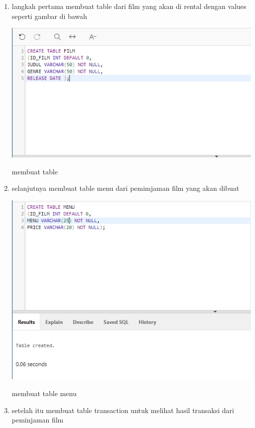 \documentclass{article}
\begin{document}
\begin{enumerate}
    \item langkah pertama membuat table dari film yang akan di rental dengan values seperti gambar di bawah
      
    \begin{center}
         \centering
            \includegraphics[scale=0.27]{figures/1.PNG}
        \caption{membuat table }
        \label{create}
    \end{center}
    
     \item selanjutnya membuat table menu dari pemimjaman film yang akan dibuat
      
    \begin{center}
         \centering
            \includegraphics[scale=0.27]{figures/2.PNG}
        \caption{membuat table menu }
        \label{create}
    \end{center}
    
     \item setelah itu membuat table transaction untuk melihat hasil transaksi dari peminjaman film
      

\end{enumerate}
\end{document}
